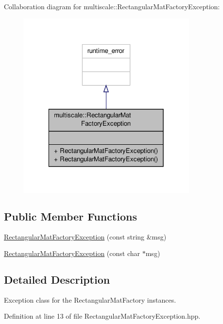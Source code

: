 Collaboration diagram for multiscale\-:\-:Rectangular\-Mat\-Factory\-Exception\-:\nopagebreak
\begin{figure}[H]
\begin{center}
\leavevmode
\includegraphics[width=256pt]{classmultiscale_1_1RectangularMatFactoryException__coll__graph}
\end{center}
\end{figure}
\subsection*{Public Member Functions}
\begin{DoxyCompactItemize}
\item 
\hyperlink{classmultiscale_1_1RectangularMatFactoryException_a757d4fb8d5f90bcb27b23245dd995c59}{Rectangular\-Mat\-Factory\-Exception} (const string \&msg)
\item 
\hyperlink{classmultiscale_1_1RectangularMatFactoryException_a74ded8fc9f6d4e7b76dbe46af77c5c58}{Rectangular\-Mat\-Factory\-Exception} (const char $\ast$msg)
\end{DoxyCompactItemize}


\subsection{Detailed Description}
Exception class for the Rectangular\-Mat\-Factory instances. 

Definition at line 13 of file Rectangular\-Mat\-Factory\-Exception.\-hpp.



